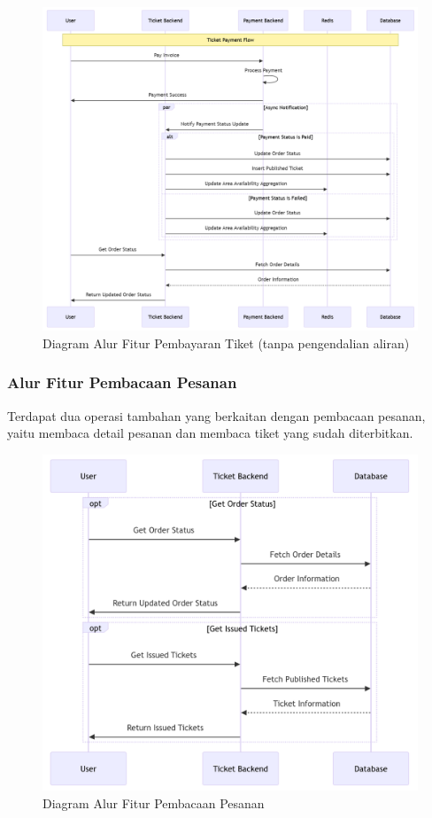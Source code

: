 \begin{figure}[h]
    \centering
    \includegraphics[width=1\textwidth]{resources/chapter-3/order-payment.png}
    \caption{Diagram Alur Fitur Pembayaran Tiket (tanpa pengendalian aliran)}
    \label{fig:flow-order-payment-fc}
\end{figure}

\pagebreak

\subsubsection{Alur Fitur Pembacaan Pesanan}

Terdapat dua operasi tambahan yang berkaitan dengan pembacaan pesanan, yaitu membaca detail pesanan dan membaca tiket yang sudah diterbitkan.

\begin{figure}[h]
    \centering
    \includegraphics[width=1\textwidth]{resources/chapter-3/order-flow.png}
    \caption{Diagram Alur Fitur Pembacaan Pesanan}
    \label{fig:flow-order-flow}
\end{figure}